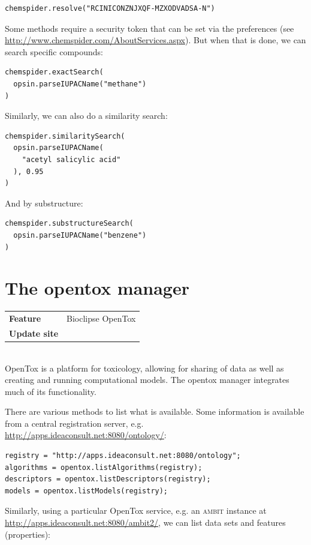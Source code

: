 \documentclass[a5paper, 10pt]{memoir}
\begin{document}
\begin{refsection}
\begin{Verbatim}
chemspider.resolve("RCINICONZNJXQF-MZXODVADSA-N")
\end{Verbatim}
Some methods require a security token that can be set via the preferences (see
\url{http://www.chemspider.com/AboutServices.aspx}). But when that is done, we
can search specific compounds:

\begin{Verbatim}
chemspider.exactSearch(
  opsin.parseIUPACName("methane")
)
\end{Verbatim}
Similarly, we can also do a similarity search:

\begin{Verbatim}
chemspider.similaritySearch(
  opsin.parseIUPACName(
    "acetyl salicylic acid"
  ), 0.95
)
\end{Verbatim}
And by substructure:

\begin{Verbatim}
chemspider.substructureSearch(
  opsin.parseIUPACName("benzene")
)
\end{Verbatim}

\section{The opentox manager}

\begin{tabular}{ll}
\textbf{Feature} & Bioclipse OpenTox \\
\textbf{Update site} & \url{} \\
\end{tabular} \\

\noindent
OpenTox is a platform for toxicology, allowing for sharing of
data as well as creating and running computational
models\cite{hardy2010collaborative}. The opentox manager integrates much of its
functionality\cite{willighagen2011computational}.

There are various methods to list what is available. Some information is
available from a central registration server, e.g.
\url{http://apps.ideaconsult.net:8080/ontology/}:

\begin{Verbatim}
registry = "http://apps.ideaconsult.net:8080/ontology";
algorithms = opentox.listAlgorithms(registry);
descriptors = opentox.listDescriptors(registry);
models = opentox.listModels(registry);
\end{Verbatim}
Similarly, using a particular OpenTox service, e.g. an
\textsc{ambit} instance at
\url{http://apps.ideaconsult.net:8080/ambit2/}\cite{jeliazkova2011ambit}, we
can list data sets and features
(properties):


\end{refsection}
\end{document}

